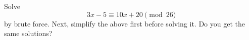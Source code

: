   Solve
  \[
    3x - 5 \equiv 10x  + 20 \pmod{26}
  \]
  by brute force.
  Next, simplify the above first before solving it.
  Do you get the same solutions?
